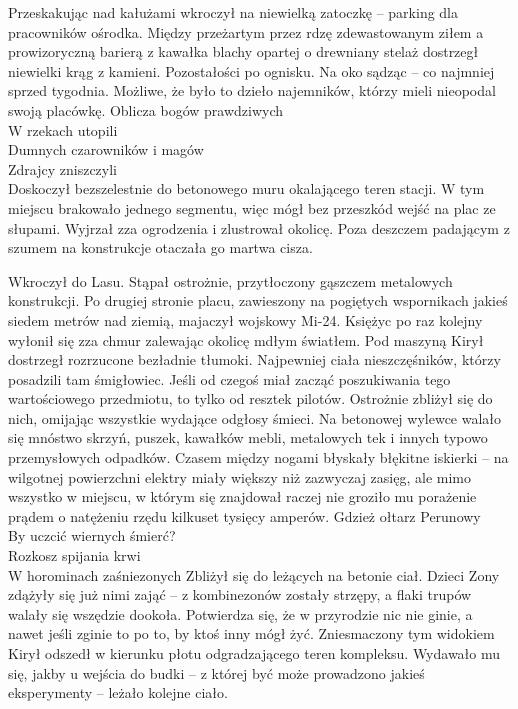 \documentclass[../MAIN.tex]{subfiles}
\begin{document}
Przeskakując nad kałużami wkroczył na niewielką zatoczkę – parking dla pracowników ośrodka. Między przeżartym przez rdzę zdewastowanym ziłem a prowizoryczną barierą z kawałka blachy opartej o drewniany stelaż dostrzegł niewielki krąg z kamieni. Pozostałości po ognisku. Na oko sądząc – co najmniej sprzed tygodnia. Możliwe, że było to dzieło najemników, którzy mieli nieopodal swoją placówkę.
\sw[16em]
Oblicza bogów prawdziwych\\
W rzekach utopili\\
Dumnych czarowników i magów\\
Zdrajcy zniszczyli\\
\qw
Doskoczył bezszelestnie do betonowego muru okalającego teren stacji. W tym miejscu brakowało jednego segmentu, więc mógł bez przeszkód wejść na plac ze słupami. Wyjrzał zza ogrodzenia i zlustrował okolicę. Poza deszczem padającym z szumem na konstrukcje otaczała go martwa cisza.

Wkroczył do Lasu. Stąpał ostrożnie, przytłoczony gąszczem metalowych konstrukcji. Po drugiej stronie placu, zawieszony na pogiętych wspornikach jakieś siedem metrów nad ziemią, majaczył wojskowy Mi-24. Księżyc po raz kolejny wyłonił się zza chmur zalewając okolicę mdłym światłem. Pod maszyną Kirył dostrzegł rozrzucone bezładnie tłumoki. Najpewniej ciała nieszczęśników, którzy posadzili tam śmigłowiec. Jeśli od czegoś miał zacząć poszukiwania tego wartościowego przedmiotu, to tylko od resztek pilotów. Ostrożnie zbliżył się do nich, omijając wszystkie wydające odgłosy śmieci. Na betonowej wylewce walało się mnóstwo skrzyń, puszek, kawałków mebli, metalowych tek i innych typowo przemysłowych odpadków. Czasem między nogami błyskały błękitne iskierki – na wilgotnej powierzchni elektry miały większy niż zazwyczaj zasięg, ale mimo wszystko w miejscu, w którym się znajdował raczej nie groziło mu porażenie prądem o natężeniu rzędu kilkuset tysięcy amperów.
\sw
Gdzież ołtarz Perunowy\\
By uczcić wiernych śmierć?\\
Rozkosz spijania krwi\\
W horominach zaśniezonych
\qw
Zbliżył się do leżących na betonie ciał. Dzieci Zony zdążyły się już nimi zająć – z kombinezonów zostały strzępy, a flaki trupów walały się wszędzie dookoła. Potwierdza się, że w przyrodzie nic nie ginie, a nawet jeśli zginie to po to, by ktoś inny mógł żyć. Zniesmaczony tym widokiem Kirył odszedł w kierunku płotu odgradzającego teren kompleksu. Wydawało mu się, jakby u wejścia do budki – z której być może prowadzono jakieś eksperymenty – leżało kolejne ciało.
\end{document}
